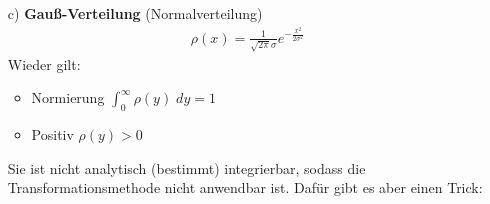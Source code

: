 \documentclass[12pt]{article}
\begin{document}
\begin{itemize}
\item[c)] \textbf{Gauß-Verteilung } (Normalverteilung) \\
\begin{align*}
\rho(x)= \frac{1}{\sqrt{2 \pi} \sigma} e^{-\frac{x^2}{2 \sigma^2}}
\end{align*}
Wieder gilt:
 \begin{itemize}
	 \item Normierung 
  		$\int_0^\infty  \rho(y) \; dy = 1 $
 	\item Positiv
 		$\rho(y) > 0 $
\end{itemize}


Sie ist nicht analytisch (bestimmt) integrierbar, sodass die Transformationsmethode nicht anwendbar ist. Dafür gibt es aber einen Trick: \\


\end{itemize}
\end{document}
